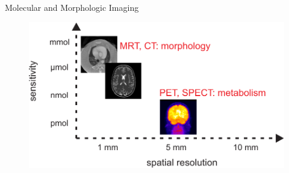 \begin{frame}[c]{Molecular and Morphologic Imaging}
	\begin{figure}
		\includegraphics[width=.8\linewidth]{Bilder/moletab.pdf}
	\end{figure}
\end{frame}







